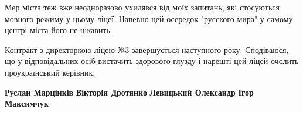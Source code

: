 Мер міста теж вже неодноразово ухилявся від моїх запитань, які стосуються
мовного режиму у цьому ліцеї. Напевно цей осередок "русского мира" у самому
центрі міста його не цікавить.

Контракт з директоркою ліцею №3 завершується наступного року. Сподіваюся, що у
відповідальних осіб вистачить здорового глузду і нарешті цей ліцей очолить
проукраїнський керівник.

\textbf{Руслан Марцінків} \textbf{Вікторія Дротянко} \textbf{Левицький Олександр} \textbf{Ігор Максимчук}

